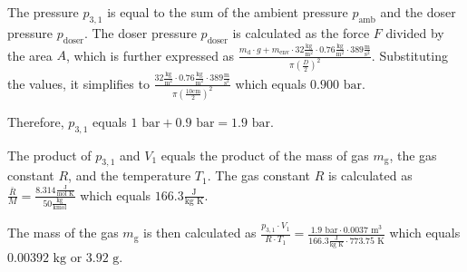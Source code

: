 The pressure \( p_{3,1} \) is equal to the sum of the ambient pressure \( p_{\text{amb}} \) and the doser pressure \( p_{\text{doser}} \). The doser pressure \( p_{\text{doser}} \) is calculated as the force \( F \) divided by the area \( A \), which is further expressed as \( \frac{m_{\text{d}} \cdot g + m_{\text{env}} \cdot 32 \frac{\text{kg}}{\text{m}^2} \cdot 0.76 \frac{\text{kg}}{\text{m}^2} \cdot 389 \frac{\text{m}}{\text{s}^2}}{\pi \left( \frac{D}{2} \right)^2} \). Substituting the values, it simplifies to \( \frac{32 \frac{\text{kg}}{\text{m}^2} \cdot 0.76 \frac{\text{kg}}{\text{m}^2} \cdot 389 \frac{\text{m}}{\text{s}^2}}{\pi \left( \frac{10 \text{cm}}{2} \right)^2} \) which equals \( 0.900 \text{ bar} \).

Therefore, \( p_{3,1} \) equals \( 1 \text{ bar} + 0.9 \text{ bar} = 1.9 \text{ bar} \).

The product of \( p_{3,1} \) and \( V_1 \) equals the product of the mass of gas \( m_{\text{g}} \), the gas constant \( R \), and the temperature \( T_1 \). The gas constant \( R \) is calculated as \( \frac{\bar{R}}{M} = \frac{8.314 \frac{\text{J}}{\text{mol K}}}{50 \frac{\text{kg}}{\text{kmol}}} \) which equals \( 166.3 \frac{\text{J}}{\text{kg K}} \).

The mass of the gas \( m_{\text{g}} \) is then calculated as \( \frac{p_{3,1} \cdot V_1}{R \cdot T_1} = \frac{1.9 \text{ bar} \cdot 0.0037 \text{ m}^3}{166.3 \frac{\text{J}}{\text{kg K}} \cdot 773.75 \text{ K}} \) which equals \( 0.00392 \text{ kg} \) or \( 3.92 \text{ g} \).